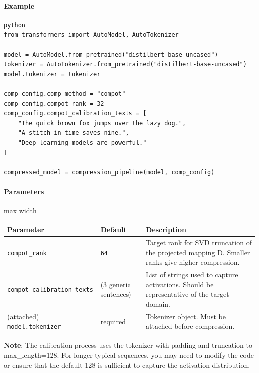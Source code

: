 \paragraph{Example}

\vspace{0.5em}
\begin{mdframed}[backgroundcolor=codebg, linecolor=codeframe, linewidth=1pt, roundcorner=4pt, innerleftmargin=2pt, innerrightmargin=5pt, innertopmargin=5pt, innerbottommargin=5pt]
\begin{lstlisting}
python
from transformers import AutoModel, AutoTokenizer

model = AutoModel.from_pretrained("distilbert-base-uncased")
tokenizer = AutoTokenizer.from_pretrained("distilbert-base-uncased")
model.tokenizer = tokenizer

comp_config.comp_method = "compot"
comp_config.compot_rank = 32
comp_config.compot_calibration_texts = [
    "The quick brown fox jumps over the lazy dog.",
    "A stitch in time saves nine.",
    "Deep learning models are powerful."
]

compressed_model = compression_pipeline(model, comp_config)
\end{lstlisting}
\end{mdframed}
\vspace{0.5em}

\paragraph{Parameters}

\begin{center}
\begin{adjustbox}{max width=\columnwidth}
\renewcommand{\arraystretch}{1.2}
\begin{tabular}{lll}
\toprule
Parameter & Default & Description \\
\midrule
\texttt{compot\_rank} & \texttt{64} & Target rank for SVD truncation of the projected mapping D. Smaller ranks give higher compression. \\
\texttt{compot\_calibration\_texts} & (3 generic sentences) & List of strings used to capture activations. Should be representative of the target domain. \\
(attached) \texttt{model.tokenizer} & required & Tokenizer object. Must be attached before compression. \\

\bottomrule
\end{tabular}
\end{adjustbox}
\end{center}
\textbf{Note}: The calibration process uses the tokenizer with padding and truncation to max\_length=128. For longer typical sequences, you may need to modify the code or ensure that the default 128 is sufficient to capture the activation distribution.


